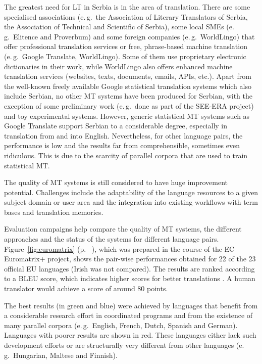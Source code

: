 \begin{multicols}{2}
The greatest need for LT in Serbia is in the area of translation. There are some specialised associations (e.\,g.~the Association of Literary Translators of Serbia, the Association of Technical and Scientific of Serbia), some local SMEs (e.\,g.~Elitence and Proverbum) and some foreign companies (e.\,g.~WorldLingo) that offer professional translation services or free, phrase-based machine translation (e.\,g.~Google Translate, WorldLingo). Some of them use proprietary electronic dictionaries in their work, while WorldLingo also offers enhanced machine translation services (websites, texts, documents, emails, APIs, etc.). Apart from the well-known freely available Google statistical translation systems which also include Serbian, no other MT systems have been produced for Serbian, with the exception of some preliminary work (e.\,g.~done as part of the SEE-ERA project) and toy experimental systems. However, generic statistical MT systems such as Google Translate support Serbian to a considerable degree, especially in translation from and into English. Nevertheless, for other language pairs, the performance is low and the results far from comprehensible, sometimes even ridiculous. This is due to the scarcity of parallel corpora that are used to train statistical MT.

The quality of MT systems is still considered to have huge improvement potential. Challenges include the adaptability of the language resources to a given subject domain or user area and the integration into existing workflows with term bases and translation memories. 

Evaluation campaigns help compare the quality of MT systems, the different approaches and the status of the systems for different language pairs. Figure~\ref{fig:euromatrix} (p. ~\pageref{fig:euromatrix}), which was prepared in the course of the EC Euromatrix+ project, shows the pair-wise performances obtained for 22 of the 23 official EU languages (Irish was not compared). The results are ranked according to a BLEU score, which indicates higher scores for better translations \cite{bleu1}. A human translator would achieve a score of around 80 points.

The best results (in green and blue) were achieved by languages that benefit from a considerable research effort in coordinated programs and from the existence of many parallel corpora (e.\,g.~English, French, Dutch, Spanish and German). Languages with poorer results are shown in red. These languages either lack such development efforts or are structurally very different from other languages (e.\,g.~Hungarian, Maltese and Finnish).



\end{multicols}
